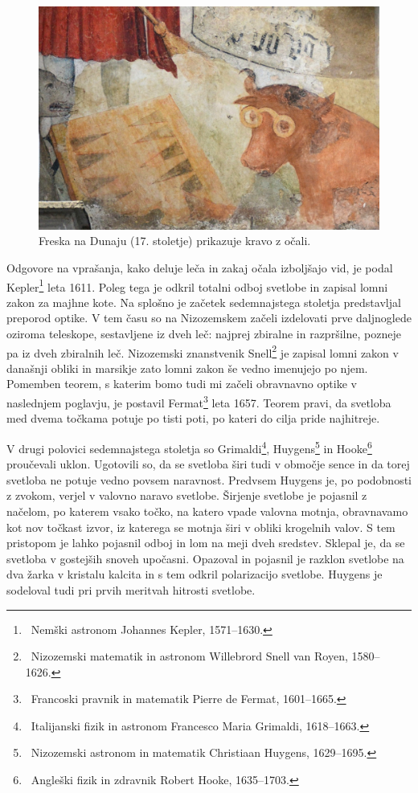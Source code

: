 \begin{figure}[ht]
\centering
\includegraphics[width=85truemm]{slike/01_Dunaj.jpg}
\caption{Freska na Dunaju (17. stoletje) prikazuje kravo z očali.}
\label{fig:01_Dunaj}
\end{figure}

Odgovore na vprašanja, kako deluje leča in zakaj očala izboljšajo vid, je podal
Kepler\footnote{~Nemški astronom Johannes Kepler, 1571--1630.} leta 1611.
Poleg tega je odkril totalni odboj svetlobe in zapisal lomni zakon za majhne kote.
Na splošno je začetek sedemnajstega stoletja predstavljal preporod optike. 
V tem času so na Nizozemskem začeli izdelovati prve daljnoglede oziroma
teleskope, sestavljene iz dveh leč:
najprej zbiralne in razpršilne, pozneje pa iz dveh zbiralnih leč. 
Nizozemski znanstvenik Snell\footnote{~Nizozemski matematik in astronom Willebrord 
Snell van Royen, 1580--1626.} je zapisal lomni zakon v današnji obliki in 
marsikje zato lomni zakon še vedno imenujejo po njem. Pomemben teorem, s katerim
bomo tudi mi začeli obravnavno optike v naslednjem poglavju, je postavil 
Fermat\footnote{~Francoski pravnik in matematik Pierre de Fermat, 1601--1665.} 
leta 1657. Teorem pravi, da svetloba med dvema točkama potuje po tisti poti, 
po kateri do cilja pride najhitreje.

V drugi polovici sedemnajstega stoletja so Grimaldi\footnote{~Italijanski 
fizik in astronom Francesco Maria Grimaldi, 1618--1663.}, Huygens\footnote{~Nizozemski 
astronom in matematik Christiaan Huygens, 1629--1695.} in Hooke\footnote{~Angleški 
fizik in zdravnik Robert Hooke, 1635--1703.} proučevali uklon. Ugotovili so, da se 
svetloba širi tudi v območje sence in da torej svetloba ne potuje vedno 
povsem naravnost. Predvsem Huygens je, po podobnosti z zvokom, verjel v 
valovno naravo svetlobe. Širjenje svetlobe je pojasnil z načelom, 
po katerem vsako točko, na katero vpade valovna motnja, obravnavamo 
kot nov točkast izvor, iz katerega se motnja širi v obliki krogelnih valov. 
S tem pristopom je lahko pojasnil odboj in lom na meji dveh sredstev. Sklepal je, da
se svetloba v gostejših snoveh upočasni.
Opazoval in pojasnil je razklon svetlobe na dva žarka v kristalu kalcita 
in s tem odkril polarizacijo svetlobe. Huygens je sodeloval tudi pri 
prvih meritvah hitrosti svetlobe. 


